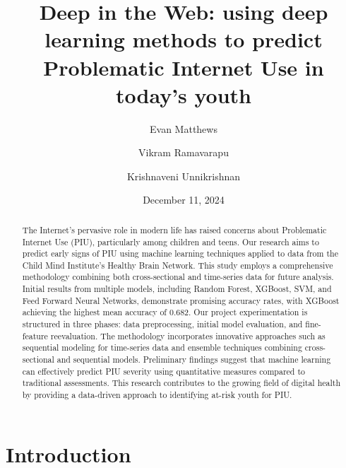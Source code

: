 \documentclass[12pt]{extarticle}
\title{Deep in the Web: using deep learning methods to predict Problematic Internet Use in today's youth}
\author[1]{Evan Matthews}
\author[1]{Vikram Ramavarapu}
\author[1]{Krishnaveni Unnikrishnan}
\affil[1]{CS 412 Group G6}
\date{December 11, 2024}
\begin{document}
\maketitle

\begin{abstract}
    The Internet's pervasive role in modern life has raised concerns about Problematic Internet Use (PIU), particularly among children and teens. 
    Our research aims to predict early signs of PIU using machine learning techniques applied to data from the Child Mind Institute's Healthy Brain Network. 
    This study employs a comprehensive methodology combining both cross-sectional and time-series data for future analysis. 
    Initial results from multiple models, including Random Forest, XGBoost, SVM, and Feed Forward Neural Networks, demonstrate promising accuracy rates, with XGBoost achieving the highest mean accuracy of 0.682. 
    Our project experimentation is structured in three phases: data preprocessing, initial model evaluation, and fine-feature reevaluation. 
    The methodology incorporates innovative approaches such as sequential modeling for time-series data and ensemble techniques combining cross-sectional and sequential models. 
    Preliminary findings suggest that machine learning can effectively predict PIU severity using quantitative measures compared to traditional assessments. 
    This research contributes to the growing field of digital health by providing a data-driven approach to identifying at-risk youth for PIU.
\end{abstract}

\pagebreak

\section{Introduction}
\end{document}
